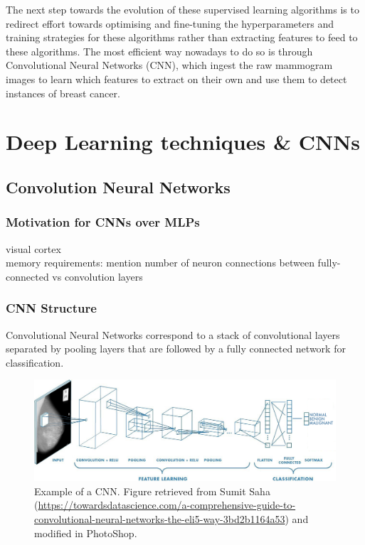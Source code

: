 The next step towards the evolution of these supervised learning algorithms is to redirect effort towards optimising and fine-tuning the hyperparameters and training strategies for these algorithms rather than extracting features to feed to these algorithms. The most efficient way nowadays to do so is through Convolutional Neural Networks (CNN), which ingest the raw mammogram images to learn which features to extract on their own and use them to detect instances of breast cancer.

% 


\section{Deep Learning techniques \& CNNs}
\label{sec:litsurvey-DLtechniques-CNN}

\subsection{Convolution Neural Networks}

\subsubsection{Motivation for CNNs over MLPs}

visual cortex\\

memory requirements: mention number of neuron connections between fully-connected vs convolution layers

\subsubsection{CNN Structure}

Convolutional Neural Networks correspond to a stack of convolutional layers separated by pooling layers that are followed by a fully connected network for classification.

\begin{figure}[ht]
\centerline{\includegraphics[width=\textwidth]{Dissertation/figures/litsurvey/CNN example.png}}
\caption{\label{fig:litsurvey-CNN-example}Example of a CNN. Figure retrieved from Sumit Saha (\url{https://towardsdatascience.com/a-comprehensive-guide-to-convolutional-neural-networks-the-eli5-way-3bd2b1164a53}) and modified in PhotoShop.}
\end{figure}

